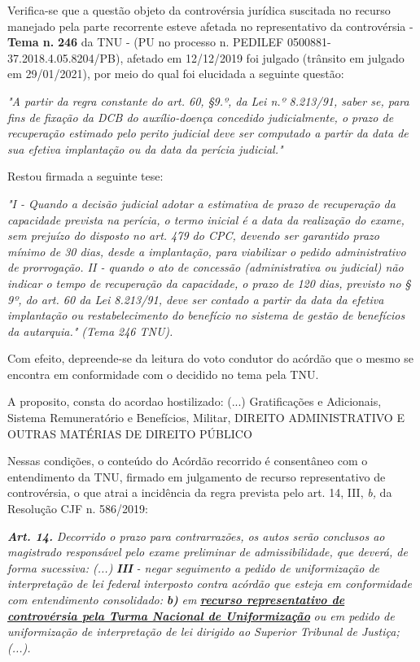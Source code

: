 \documentclass[12pt]{article}
\begin{document}
\justifying
\noindent Verifica-se que a questão objeto da controvérsia jurídica suscitada no recurso manejado pela parte recorrente esteve afetada no representativo da controvérsia - \textbf{Tema n. }\textbf{246} da TNU - (PU no processo n. PEDILEF 0500881-37.2018.4.05.8204/PB),  afetado em 12/12/2019 foi julgado (trânsito em julgado em 29/01/2021), por meio do qual foi elucidada a seguinte questão:

\noindent \textit{"A partir da regra constante do art. 60, §9.º, da Lei n.º 8.213/91, saber se, para fins de fixação da DCB do auxílio-doença concedido judicialmente, o prazo de recuperação estimado pelo perito judicial deve ser computado a partir da data de sua efetiva implantação ou da data da perícia judicial."}

\noindent Restou firmada a seguinte tese:

\noindent \textit{"I - Quando a decisão judicial adotar a estimativa de prazo de recuperação da capacidade prevista na perícia, o termo inicial é a data da realização do exame, sem prejuízo do disposto no art. 479 do CPC, devendo ser garantido prazo mínimo de 30 dias, desde a implantação, para viabilizar o pedido administrativo de prorrogação. II - quando o ato de concessão (administrativa ou judicial) não indicar o tempo de recuperação da capacidade, o prazo de 120 dias, previsto no § 9º, do art. 60 da Lei 8.213/91, deve ser contado a partir da data da efetiva implantação ou restabelecimento do benefício no sistema de gestão de benefícios da autarquia." (Tema 246 TNU).}

\noindent Com efeito, depreende-se da leitura do voto condutor do acórdão que o mesmo se encontra em conformidade com o decidido no  tema pela TNU.

\noindent A proposito, consta do acordao hostilizado: (...) Gratificações e Adicionais, Sistema Remuneratório e Benefícios, Militar, DIREITO ADMINISTRATIVO E OUTRAS MATÉRIAS DE DIREITO PÚBLICO

\noindent Nessas condições, o conteúdo do Acórdão recorrido é consentâneo com o entendimento da TNU, firmado em julgamento de recurso representativo de controvérsia, o que atrai a incidência da regra prevista pelo art. 14, III, \textit{b,} da Resolução CJF n. 586/2019:

\noindent \textit{\textbf{Art. 14.}}\textit{ Decorrido o prazo para contrarrazões, os autos serão conclusos ao magistrado responsável pelo exame preliminar de admissibilidade, que deverá, de forma sucessiva: (...) }\textit{\textbf{III }}\textit{- negar seguimento a pedido de uniformização de interpretação de lei federal interposto contra acórdão que esteja em conformidade com entendimento consolidado: }\textit{\textbf{b)}}\textit{ em }\uline{\textit{\textbf{recurso representativo de controvérsia pela Turma Nacional de Uniformização}}}\textit{ ou em pedido de uniformização de interpretação de lei dirigido ao Superior Tribunal de Justiça;(...).}
\end{document}

